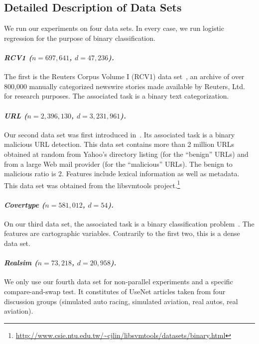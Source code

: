 \documentclass[twoside, 11pt]{article}
\begin{document}
\subsection{Detailed Description of Data Sets}\label{apx:datasets}
We run our experiments on four data sets. In every case, we run logistic regression for the purpose of binary classification.

\paragraph{\textit{RCV1 ($n=697,641$, $d=47,236$).}}
The first is the Reuters Corpus Volume I (RCV1) data set~\citep{RCV1}, an archive of over 800,000 manually categorized newswire stories made available by Reuters, Ltd. for research purposes.
The associated task is a binary text categorization.

\paragraph{\textit{URL ($n=2,396,130$, $d=3,231,961$).}}
Our second data set was first introduced in~\citet{URL}. Its associated task is a binary malicious URL detection.
This data set contains more than 2 million URLs obtained at random from Yahoo's directory listing (for the ``benign'' URLs) and from a large Web mail provider (for the ``malicious'' URLs).
The benign to malicious ratio is 2.
Features include lexical information as well as metadata.
This data set was obtained from the libsvmtools project.\footnote{\url{http://www.csie.ntu.edu.tw/~cjlin/libsvmtools/datasets/binary.html}}

\paragraph{\textit{Covertype ($n=581,012$, $d=54$).}}
On our third data set, the associated task is a binary classification problem~\citep[down from 7 classes originally, following the pre-treatment of][]{Covtype}. The features are cartographic variables.
Contrarily to the first two, this is a dense data set.

\paragraph{\textit{Realsim ($n=73,218$, $d=20,958$).}}
We only use our fourth data set for non-parallel experiments and a specific compare-and-swap test.
It constitutes of UseNet articles taken from four discussion groups (simulated auto racing, simulated aviation, real autos, real aviation).
\end{document}
